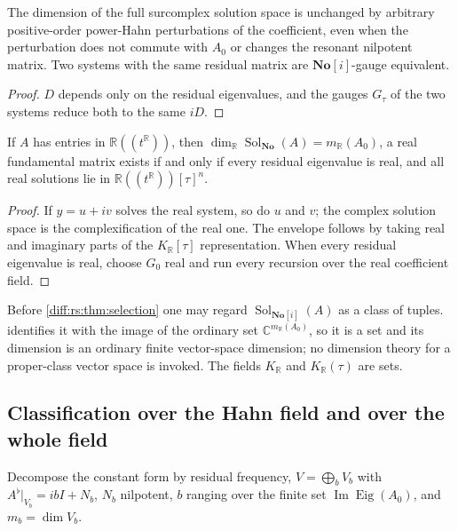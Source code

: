 \documentclass[11pt,letterpaper]{article}
\numberwithin{equation}{section}
\theoremstyle{definition}
\theoremstyle{remark}
\newcommand{\No}{\mathbf{No}}
\newcommand{\SC}{\mathbf{No}[i]}
\newcommand{\R}{\mathbb R}
\newcommand{\C}{\mathbb C}
\newcommand{\Imm}{\operatorname{Im}}
\newcommand{\KR}{K_{\R}}
\newcommand{\Eig}{\operatorname{Eig}}
\newcommand{\Sol}{\operatorname{Sol}}
\begin{document}
\begin{corollary}
\label{diff:rs:cor:invariance}
The dimension of the full surcomplex solution space is unchanged by arbitrary
positive-order power-Hahn perturbations of the coefficient, even when the
perturbation does not commute with $A_{0}$ or changes the resonant nilpotent
matrix. Two systems with the same residual matrix are $\SC$-gauge equivalent.
\end{corollary}
\begin{proof}
$D$ depends only on the residual eigenvalues, and the gauges $G_{\tau}$ of the
two systems reduce both to the same $iD$.
\end{proof}

\begin{corollary}
\label{diff:rs:cor:real}
If $A$ has entries in $\R((t^{\R}))$, then $\dim_{\R}\Sol_{\No}(A)=m_{\R}(A_{0})$,
a real fundamental matrix exists if and only if every residual eigenvalue is
real, and all real solutions lie in $\R((t^{\R}))[\tau]^{n}$.
\end{corollary}
\begin{proof}
If $y=u+iv$ solves the real system, so do $u$ and $v$; the complex solution
space is the complexification of the real one. The envelope follows by taking
real and imaginary parts of the $\KR[\tau]$ representation. When every
residual eigenvalue is real, choose $G_{0}$ real and run every recursion over
the real coefficient field.
\end{proof}

\begin{remark}
\label{diff:rs:rem:setsized}
Before \cref{diff:rs:thm:selection} one may regard $\Sol_{\SC}(A)$ as a class of
tuples.  identifies it with the image of the ordinary
set $\C^{m_{\R}(A_{0})}$, so it is a set and its dimension is an ordinary finite
vector-space dimension; no dimension theory for a proper-class vector space is
invoked. The fields $\KR$ and $\KR(\tau)$ are sets.
\end{remark}

\subsection{Classification over the Hahn field and over the whole field}
\label{diff:rs:sub:classification}

Decompose the constant form by residual frequency,
$V=\bigoplus_{b}V_{b}$ with $A^{\flat}|_{V_{b}}=ibI+N_{b}$, $N_{b}$ nilpotent,
$b$ ranging over the finite set $\Imm\Eig(A_{0})$, and $m_{b}=\dim V_{b}$.
\end{document}
